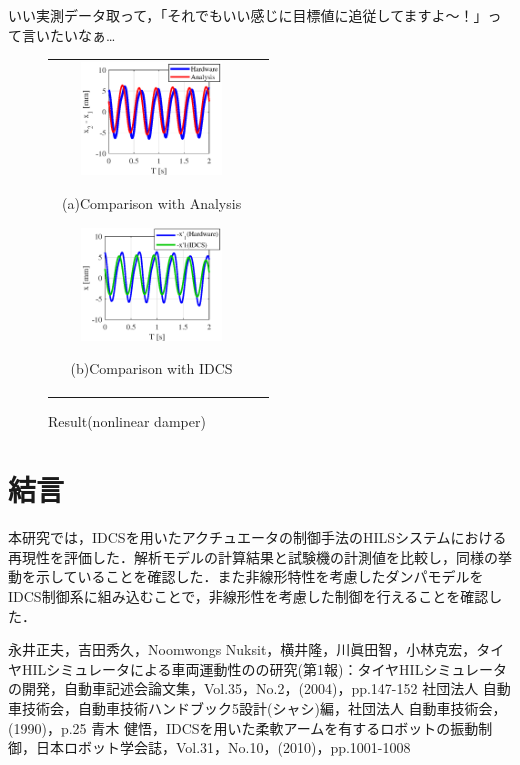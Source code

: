 \documentclass{article_vdlab_sotsuron_youshi}
\begin{document}
いい実測データ取って，「それでもいい感じに目標値に追従してますよ～！」って言いたいなぁ…

\vspace*{2mm}
\begin{figure}[h]
  \begin{tabular}{cc}
  \begin{minipage}{0.5\hsize}
  \begin{center}
    \includegraphics[height=30mm]{figure/sus_nonlinear_5_3.eps}
    \end{center}
    \begin{center}
      \vspace{-3mm}
    \ (a)Comparison with Analysis\
    \end{center}
  \end{minipage}
  \begin{minipage}{0.5\hsize}
     \begin{center}
      \includegraphics[height=30mm]{figure/idcs_nonlinear_5_3.eps}
      \end{center}
      \begin{center}
        \vspace{-3mm}
      \ (b)Comparison with IDCS\
    \end{center}
  \end{minipage}
  \end{tabular}
  \caption{Result(nonlinear damper)}
    \label{fig:idcs_nonlinear}
\end{figure}

\section{結言}
本研究では，IDCSを用いたアクチュエータの制御手法のHILSシステムにおける再現性を評価した．解析モデルの計算結果と試験機の計測値を比較し，同様の挙動を示していることを確認した．また非線形特性を考慮したダンパモデルをIDCS制御系に組み込むことで，非線形性を考慮した制御を行えることを確認した．

\begin{thebibliography}{99}
永井正夫，吉田秀久，Noomwongs Nuksit，横井隆，川眞田智，小林克宏，タイヤHILシミュレータによる車両運動性のの研究(第1報)：タイヤHILシミュレータの開発，自動車記述会論文集，Vol.35，No.2，(2004)，pp.147-152
\bibitem{2dof}社団法人 自動車技術会，自動車技術ハンドブック5設計(シャシ)編，社団法人 自動車技術会，(1990)，p.25
\bibitem{method_idcs}青木 健悟，IDCSを用いた柔軟アームを有するロボットの振動制御，日本ロボット学会誌，Vol.31，No.10，(2010)，pp.1001-1008
\end{thebibliography}
\end{document}
